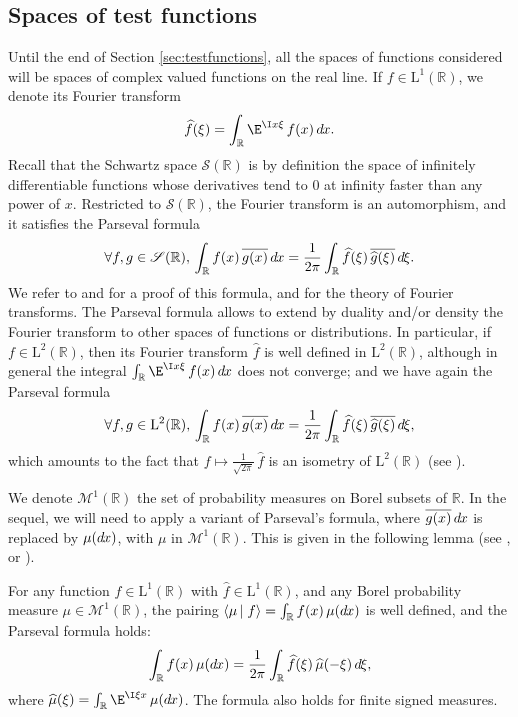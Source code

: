 \documentclass[envcountsame]{svmult}
\newcommand{\R}{\mathbb{R}}
\newcommand{\leb}{\mathrm{L}}
\newcommand{\schwartz}{\mathscr{S}}
\newcommand{\scal}[2]{\left\langle #1\vphantom{#2}\,\right |\left.#2 \vphantom{#1}\right\rangle}
\newcommand{\DD}[1]{\,d\hspace*{-0.3mm}{#1}}
\begin{document}
\subsection{Spaces of test functions}\label{subsec:distributions}
Until the end of Section \ref{sec:testfunctions}, all the spaces of functions considered will be spaces of complex valued functions on the real line. If $f \in \leb^1(\R)$, we denote its Fourier transform
$$\widehat{f}(\xi)=\int_{\R} \E^{\I x\xi}\,f(x)\DD{x}.$$
Recall that the Schwartz space $\schwartz(\R)$ is by definition the space of 
infinitely differentiable functions whose derivatives tend to $0$ at infinity faster than any power of $x$.
Restricted to $\schwartz(\R)$, the Fourier transform is an automorphism, and it satisfies the Parseval formula
$$\forall f,g \in \schwartz(\R),\\ \int_{\R} f(x) \,\overline{g(x)}\DD{x} = \frac{1}{2\pi} \int_{\R} \widehat{f}(\xi)\,\overline{\widehat{g}(\xi)}\DD{\xi}.$$
We refer to \cite[Chapter VIII]{Lang93} and \cite[Part II]{Rud91} for a proof of this formula, and for the theory of Fourier transforms. The Parseval formula allows to extend by duality and/or density the Fourier transform to other spaces of functions or distributions. In particular, if $f \in \leb^2(\R)$, then its Fourier transform $\widehat{f}$ is well defined in $\leb^2(\R)$, although in general the integral $\int_{\R} \E^{\I x\xi}\,f(x)\DD{x}$ does not converge;  and we have again the Parseval formula
$$\forall f,g \in \leb^2(\R),\\ \int_{\R} f(x) \,\overline{g(x)}\DD{x} = \frac{1}{2\pi} \int_{\R} \widehat{f}(\xi)\,\overline{\widehat{g}(\xi)}\DD{\xi},$$
which amounts to the fact that $f \mapsto \frac{1}{\sqrt{2\pi}}\,\widehat{f}$ is an isometry of $\leb^2(\R)$ (see \cite[\S7.9]{Rud91}).\medskip

We denote $\mathscr{M}^1(\R)$ the set of probability measures on Borel subsets of $\R$.
In the sequel, we will need to apply a variant of Parseval's formula,
where $\overline{g(x)}\DD{x}$ is replaced by $\mu(\!\DD{x})$, with $\mu$ in $\mathscr{M}^1(\R)$.
This is given in the following lemma (see \cite[Lemma 2.3.3]{Stroock}, or \cite[p. 134]{Mal95}).
\begin{lemma}\label{lem:parsevalmeasures}
  For any function $f \in \leb^1(\R)$ with $\widehat{f} \in \leb^1(\R)$, and any Borel probability measure
$\mu \in \mathscr{M}^{1}(\R)$, the pairing $\scal{\mu}{f} = \int_{\R} f(x)\,\mu(\!\DD{x})$
is well defined, and the Parseval formula holds:
$$\int_{\R} f(x)\,\mu(\!\DD{x}) = \frac{1}{2\pi}\int_{\R} \widehat{f}(\xi)\,\widehat{\mu}(-\xi)\DD{\xi},$$
where $\widehat{\mu}(\xi) = \int_{\R} \E^{\I \xi x}\,\mu(\!\DD{x})$. The formula also holds for finite signed measures.
\end{lemma}
\medskip
\end{document}

